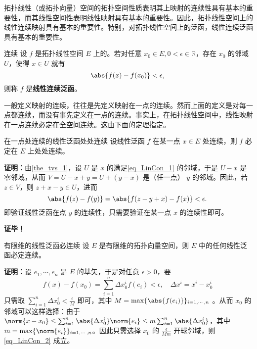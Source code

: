 
\cite{Ke1}拓扑线性（或拓扑向量）空间的拓扑空间性质表明其上映射的连续性具有基本的重要性，而其线性空间性表明线性映射具有基本的重要性。因此，拓扑线性空间上的线性连续映射具有基本的重要性。特别，对拓扑线性空间上的泛函，线性连续泛函具有基本的重要性。
\begin{definition}{连续}
设 $f$ 是拓扑线性空间 $E$ 上的。若对任意 $x_0\in E,0<\epsilon\in\mathbb R$，存在 $x_0$ 的邻域 $U$，使得 $x\in U$ 就有
\begin{equation}\label{eq_LinCon_1}
\abs{f(x)-f(x_0)}<\epsilon,~
\end{equation}
则称 $f$ 是\textbf{线性连续泛函}。
\end{definition}

一般定义映射的连续，往往是先定义映射在一点的连续。然而上面的定义是对每一点都连续，而没有事先定义在一点的连续。事实上，在拓扑线性空间中，线性映射在一点连续必定在全空间连续。这由下面的定理指定。
\begin{theorem}{在一点处连续的线性泛函处处连续}\label{the_LinCon_1}
设线性泛函 $f$ 在某一点 $x\in E$ 处连续，则 $f$ 必定在 $E$ 上处处连续。
\end{theorem}
\textbf{证明：}由\autoref{the_tvs_1}，设 $U$ 是 $x$ 的满足\autoref{eq_LinCon_1} 的邻域，于是 $U-x$ 是零邻域，从而 $V=U-x+y=U+(y-x)$ 是（任一点） $y$ 的邻域。因此，若 $z\in V$，则 $z+x-y\in U$，进而
\begin{equation}
\abs{f(z)-f(y)}=\abs{f(z-y+x)-f(x)}<\epsilon.~
\end{equation}
即验证线性泛函在点 $y$ 的连续性，只需要验证在某一点 $x$ 的连续性即可。

\textbf{证毕！}

\begin{theorem}{有限维的线性泛函必连续}
设 $E$ 是有限维的拓扑向量空间，则 $E$ 中的任何线性泛函必定连续。
\end{theorem}
\textbf{证明：}设 $e_1,\cdots,e_n$ 是 $E$ 的基矢，于是对任意 $\epsilon>0$，要
\begin{equation}\label{eq_LinCon_2}
f(x)-f(x_0)=\sum_{i=1}^n\Delta x_0^i f(e_i)<\epsilon,\quad\Delta x^i=x^i-x^i_0~
\end{equation}
 只需取 $\sum_{i=1}^n\Delta x_0^i<\frac{\epsilon}{M}$ 即可，其中 $M=\max\{\abs{f(e_i)}\}_{i=1,\cdots,n}$ 。从而 $x_0$ 的邻域可以这样选择：由于 $\norm{x-x_0}\leq\sum_{i=1}^n\abs{\Delta x_0^i}\norm{e_i}\leq m\sum_{i=1}^n\abs{\Delta x_0^i}$，其中 $m=\max\{\norm{e_i}\}_{i=1,\cdots,n}$。因此只需选择 $x_0$ 的 $\frac{\epsilon}{Mm}$ 开球邻域，则\autoref{eq_LinCon_2} 成立。

